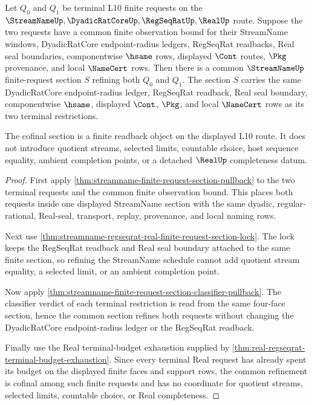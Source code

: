 \begin{theorem}
\label{thm:streamname-finite-request-cofinal-section}
Let $Q_0$ and $Q_1$ be terminal L10 finite requests on the
$\StreamNameUp,\DyadicRatCoreUp,\RegSeqRatUp,\RealUp$ route. Suppose the two
requests have a common finite observation bound for their StreamName windows,
DyadicRatCore endpoint-radius ledgers, RegSeqRat readbacks, Real seal
boundaries, componentwise $\hsame$ rows, displayed $\Cont$ routes, $\Pkg$
provenance, and local $\NameCert$ rows. Then there is a common
$\StreamNameUp$ finite-request section $S$ refining both $Q_0$ and $Q_1$.
The section $S$ carries the same DyadicRatCore endpoint-radius ledger,
RegSeqRat readback, Real seal boundary, componentwise $\hsame$, displayed
$\Cont$, $\Pkg$, and local $\NameCert$ rows as its two terminal restrictions.

The cofinal section is a finite readback object on the displayed L10 route. It
does not introduce quotient streams, selected limits, countable choice, host
sequence equality, ambient completion points, or a detached $\RealUp$
completeness datum.
\end{theorem}
\begin{proof}
First apply \autoref{thm:streamname-finite-request-section-pullback} to the two
terminal requests and the common finite observation bound. This places both
requests inside one displayed StreamName section with the same dyadic,
regular-rational, Real-seal, transport, replay, provenance, and local naming
rows.

Next use \autoref{thm:streamname-regseqrat-real-finite-request-section-lock}.
The lock keeps the RegSeqRat readback and Real seal boundary attached to the
same finite section, so refining the StreamName schedule cannot add quotient
stream equality, a selected limit, or an ambient completion point.

Now apply
\autoref{thm:streamname-finite-request-section-classifier-pullback}. The
classifier verdict of each terminal restriction is read from the same
four-face section, hence the common section refines both requests without
changing the DyadicRatCore endpoint-radius ledger or the RegSeqRat readback.

Finally use the Real terminal-budget exhaustion supplied by
\autoref{thm:real-regseqrat-terminal-budget-exhaustion}. Since every terminal
Real request has already spent its budget on the displayed finite faces and
support rows, the common refinement is cofinal among such finite requests and
has no coordinate for quotient streams, selected limits, countable choice, or
Real completeness.
\end{proof}

